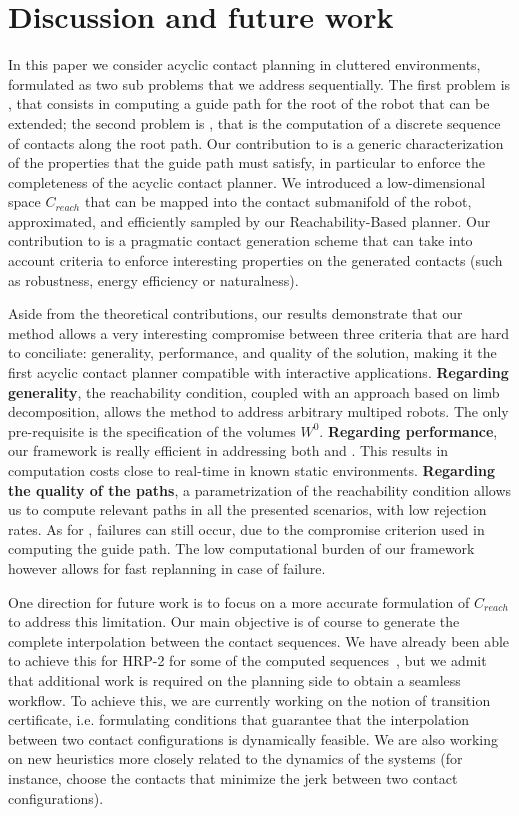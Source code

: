  \section{Discussion and future work} 
\label{sec:conclusion}

In this paper we consider acyclic contact planning in cluttered environments, formulated as two sub problems that we address sequentially.
The first problem is \Pa, that consists in computing a guide path for the root of the robot that can be extended; the second problem is \Pb, that is the computation of a discrete sequence of contacts along the root path.
Our contribution to \Pa is a generic characterization of the properties that the guide path must satisfy, in particular to enforce the completeness of the acyclic contact planner. We introduced a low-dimensional space $C_{reach}$ that can be mapped 
into the contact submanifold of the robot, approximated, and efficiently sampled by our Reachability-Based planner.
Our contribution to \Pb is a pragmatic contact generation scheme that can take into
account criteria to enforce interesting properties on the generated contacts (such as robustness, energy efficiency or naturalness).

Aside from the theoretical contributions, our results demonstrate that our method allows a very interesting compromise between three 
criteria that are hard to conciliate: generality, performance, and quality of the solution, making it the first acyclic contact
planner compatible with interactive applications.
%
\textbf{Regarding generality}, the reachability condition, coupled with an approach based on limb decomposition, 
allows the method to address arbitrary multiped robots. The only pre-requisite is the specification 
of the volumes $W^0$.
%
\textbf{Regarding performance}, our framework is really efficient in addressing both \Pa and \Pb. This results in computation costs close to real-time in
known static environments.
%
\textbf{Regarding the quality of the paths}, a parametrization of the reachability condition allows us to compute
relevant paths in all the presented scenarios, with low rejection rates.
As for \cite{Bouyarmane2009}, failures can still occur, due to the compromise criterion used in computing the guide path.
The low computational burden of our framework however allows for fast replanning in case of failure.

One direction for future work is to focus on a more accurate formulation of $C_{reach}$ to address 
this limitation.
Our main objective is of course to generate the complete interpolation between the contact sequences.
We have already been able to achieve this for HRP-2 for some of the computed sequences~\citep{Carpentier2016}, but we admit that additional
work is required on the planning side to obtain a seamless workflow. To achieve this, we are currently working on the notion of transition certificate, i.e. formulating
conditions that guarantee that the interpolation between two contact configurations is dynamically feasible. We are also
working on new heuristics more closely related to the dynamics of the systems (for instance, choose the contacts that minimize the jerk between two contact configurations).

